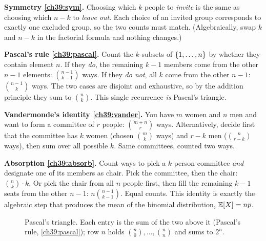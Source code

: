 \begin{whybox}
\textbf{Symmetry \eqref{ch39:sym}.} Choosing which $k$ people to \emph{invite}
is the same as choosing which $n-k$ to \emph{leave out}. Each choice of an
invited group corresponds to exactly one excluded group, so the two counts
must match. (Algebraically, swap $k$ and $n-k$ in the factorial formula and
nothing changes.)

\textbf{Pascal's rule \eqref{ch39:pascal}.} Count the $k$-subsets of
$\{1,\dots,n\}$ by whether they contain element $n$. If they \emph{do}, the
remaining $k-1$ members come from the other $n-1$ elements:
$\binom{n-1}{k-1}$ ways. If they \emph{do not}, all $k$ come from the other
$n-1$: $\binom{n-1}{k}$ ways. The two cases are disjoint and exhaustive, so by
the addition principle they sum to $\binom{n}{k}$. This single recurrence
\emph{is} Pascal's triangle.

\textbf{Vandermonde's identity \eqref{ch39:vander}.} You have $m$ women and
$n$ men and want to form a committee of $r$ people: $\binom{m+n}{r}$ ways.
Alternatively, decide first that the committee has $k$ women (chosen
$\binom{m}{k}$ ways) and $r-k$ men ($\binom{n}{r-k}$ ways), then sum over all
possible $k$. Same committees, counted two ways.

\textbf{Absorption \eqref{ch39:absorb}.} Count ways to pick a $k$-person
committee \emph{and} designate one of its members as chair. Pick the committee,
then the chair: $\binom{n}{k}\cdot k$. Or pick the chair from all $n$ people
first, then fill the remaining $k-1$ seats from the other $n-1$:
$n\binom{n-1}{k-1}$. Equal counts. This identity is exactly the algebraic step
that produces the mean of the binomial distribution, $\operatorname{\mathbb{E}}[X] = np$.
\end{whybox}

\begin{figure}[H]
\centering
{}
\caption{Pascal's triangle. Each entry is the sum of the two above it
(Pascal's rule, \eqref{ch39:pascal}); row $n$ holds $\binom{n}{0},\dots,
\binom{n}{n}$ and sums to $2^n$.}
\label{ch39:pascalfig}
\end{figure}

